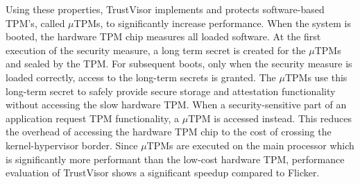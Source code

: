 Using these properties, TrustVisor implements and protects software-based TPM's, called $\mu$TPMs, to significantly increase performance. When the system is booted, the hardware TPM chip measures all loaded software. At the first execution of the security measure, a long term secret is created for the $\mu$TPMs and sealed by the TPM. For subsequent boots, only when the security measure is loaded correctly, access to the long-term secrets is granted. The $\mu$TPMs use this long-term secret to safely provide secure storage and attestation functionality without accessing the slow hardware TPM. When a security-sensitive part of an application request TPM functionality, a $\mu$TPM is accessed instead. This reduces the overhead of accessing the hardware TPM chip to the cost of crossing the kernel-hypervisor border. Since $\mu$TPMs are executed on the main processor which is significantly more performant than the low-cost hardware TPM, performance evaluation of TrustVisor shows a significant speedup compared to Flicker.





